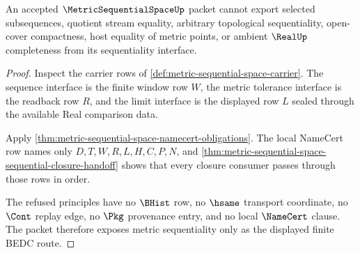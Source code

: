 \begin{theorem}
\label{thm:metric-sequential-space-nonescape}
An accepted $\MetricSequentialSpaceUp$ packet cannot export selected subsequences, quotient stream equality, arbitrary topological sequentiality, open-cover compactness, host equality of metric points, or ambient $\RealUp$ completeness from its sequentiality interface.
\end{theorem}
\begin{proof}
Inspect the carrier rows of \autoref{def:metric-sequential-space-carrier}. The sequence interface is the finite window row $W$, the metric tolerance interface is the readback row $R$, and the limit interface is the displayed row $L$ sealed through the available Real comparison data.

Apply \autoref{thm:metric-sequential-space-namecert-obligations}. The local NameCert row names only $D,T,W,R,L,H,C,P,N$, and \autoref{thm:metric-sequential-space-sequential-closure-handoff} shows that every closure consumer passes through those rows in order.

The refused principles have no $\BHist$ row, no $\hsame$ transport coordinate, no $\Cont$ replay edge, no $\Pkg$ provenance entry, and no local $\NameCert$ clause. The packet therefore exposes metric sequentiality only as the displayed finite BEDC route.
\end{proof}


\begin{closurestatus}{\MetricSequentialSpaceUp}
  \theoryclosure{\seedClosure}
  \formalstatus{\unformalizedV}
\end{closurestatus}
